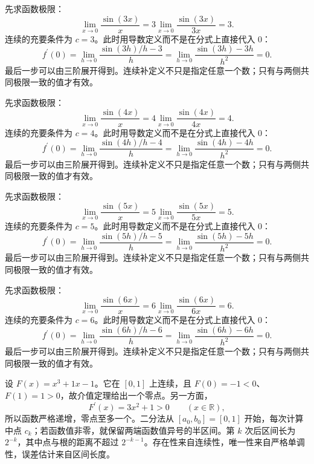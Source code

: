 \documentclass[UTF8,12pt,a4paper,fontset=fandol]{ctexart}
\begin{document}
\begin{solve}\label{ans:c6q3}
先求函数极限：
\[
\lim_{x\to0}\frac{\sin(3x)}x=3\lim_{x\to0}\frac{\sin(3x)}{3x}=3.
\]
连续的充要条件为 $c=3$。此时用导数定义而不是在分式上直接代入 $0$：
\[
f^{\prime}(0)=\lim_{h\to0}\frac{\sin(3h)/h-3}h=\lim_{h\to0}\frac{\sin(3h)-3h}{h^2}=0.
\]
最后一步可以由三阶展开得到。连续补定义不只是指定任意一个数；只有与两侧共同极限一致的值才有效。
\end{solve}

\begin{solve}\label{ans:c6q4}
先求函数极限：
\[
\lim_{x\to0}\frac{\sin(4x)}x=4\lim_{x\to0}\frac{\sin(4x)}{4x}=4.
\]
连续的充要条件为 $c=4$。此时用导数定义而不是在分式上直接代入 $0$：
\[
f^{\prime}(0)=\lim_{h\to0}\frac{\sin(4h)/h-4}h=\lim_{h\to0}\frac{\sin(4h)-4h}{h^2}=0.
\]
最后一步可以由三阶展开得到。连续补定义不只是指定任意一个数；只有与两侧共同极限一致的值才有效。
\end{solve}

\begin{solve}\label{ans:c6q5}
先求函数极限：
\[
\lim_{x\to0}\frac{\sin(5x)}x=5\lim_{x\to0}\frac{\sin(5x)}{5x}=5.
\]
连续的充要条件为 $c=5$。此时用导数定义而不是在分式上直接代入 $0$：
\[
f^{\prime}(0)=\lim_{h\to0}\frac{\sin(5h)/h-5}h=\lim_{h\to0}\frac{\sin(5h)-5h}{h^2}=0.
\]
最后一步可以由三阶展开得到。连续补定义不只是指定任意一个数；只有与两侧共同极限一致的值才有效。
\end{solve}

\begin{solve}\label{ans:c6q6}
先求函数极限：
\[
\lim_{x\to0}\frac{\sin(6x)}x=6\lim_{x\to0}\frac{\sin(6x)}{6x}=6.
\]
连续的充要条件为 $c=6$。此时用导数定义而不是在分式上直接代入 $0$：
\[
f^{\prime}(0)=\lim_{h\to0}\frac{\sin(6h)/h-6}h=\lim_{h\to0}\frac{\sin(6h)-6h}{h^2}=0.
\]
最后一步可以由三阶展开得到。连续补定义不只是指定任意一个数；只有与两侧共同极限一致的值才有效。
\end{solve}

\begin{solve}\label{ans:c6q7}
设 $F(x)=x^3+1x-1$。它在 $[0,1]$ 上连续，且 $F(0)=-1<0$、$F(1)=1>0$，故介值定理给出一个零点。另一方面，
\[
F^{\prime}(x)=3x^2+1>0\qquad(x\in\mathbb R),
\]
所以函数严格递增，零点至多一个。二分法从 $[a_0,b_0]=[0,1]$ 开始，每次计算中点 $c_k$；若函数值非零，就保留两端函数值异号的半区间。第 $k$ 次后区间长为 $2^{-k}$，其中点与根的距离不超过 $2^{-k-1}$。存在性来自连续性，唯一性来自严格单调性，误差估计来自区间长度。
\end{solve}
\end{document}
